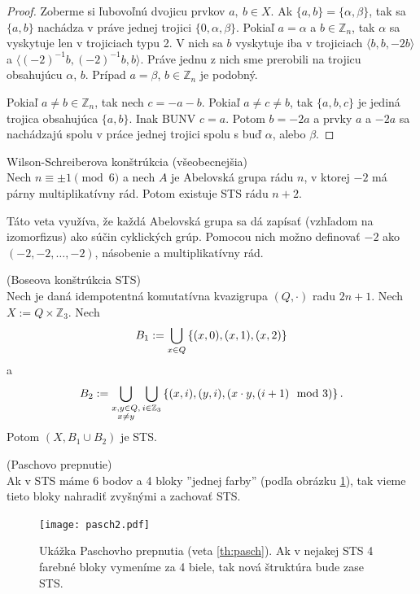 \begin{proof}
	Zoberme si ľubovoľnú dvojicu prvkov $a,\ b \in X$. Ak $\{ a, b \} = \{ \alpha, \beta \}$, tak sa $\{a, b\}$ nachádza v práve jednej trojici $\{0, \alpha, \beta \}$. Pokiaľ $a = \alpha$ a $b \in \mathbb{Z}_n$, tak $\alpha$ sa vyskytuje len v trojiciach typu 2. V nich sa $b$ vyskytuje iba v trojiciach $\langle b, b, -2b \rangle$ a $\langle (-2)^{-1}b, (-2)^{-1}b, b \rangle$. Práve jednu z nich sme prerobili na trojicu obsahujúcu $\alpha$, $b$. Prípad $a = \beta$, $b \in \mathbb{Z}_n$ je podobný.
	
	Pokiaľ $a \ne b \in \mathbb{Z}_n$, tak nech $c = - a - b$. Pokiaľ $a \ne c \ne b$, tak $\{a, b, c\}$ je jediná trojica obsahujúca $\{a, b\}$. Inak BUNV $c = a$. Potom $b = -2a$ a prvky $a$ a $-2a$ sa nachádzajú spolu v práce jednej trojici spolu s buď $\alpha$, alebo $\beta$.
\end{proof}

\begin{theorem_hard}{Wilson-Schreiberova konštrúkcia (všeobecnejšia)}\\
	Nech $n \equiv \pm 1 \pmod{6}$ a nech $A$ je Abelovská grupa rádu $n$, v ktorej $-2$ má párny multiplikatívny rád. Potom existuje STS rádu $n + 2$. 
\end{theorem_hard}

Táto veta využíva, že každá Abelovská grupa sa dá zapísať (vzhľadom na izomorfizus) ako súčin cyklických grúp. Pomocou nich možno definovať $-2$ ako $(-2,-2, \dots, -2)$, násobenie a multiplikatívny rád.

\begin{theorem_hard}{(Boseova konštrúkcia STS)}\\
\label{th:bose}
Nech je daná idempotentná komutatívna kvazigrupa $(Q, \cdot)$ radu $2n + 1$.
Nech $X := Q \times \mathbb{Z}_3$.
Nech $$B_1 := \bigcup_{x \in Q} \left\{(x, 0), (x, 1), (x, 2)\right\}$$ a $$B_2 := \bigcup_{\substack{x, y \in Q,\\ x \neq y}}\bigcup_{i \in \mathbb{Z}_3} \left\{(x, i), (y, i), (x \cdot y, (i+1) \mod 3)\right\}.$$
Potom $(X, B_1 \cup B_2)$ je STS.
\end{theorem_hard}

\begin{theorem_hard}{(Paschovo prepnutie)}\\
\label{th:pasch}
Ak v STS máme 6 bodov a 4 bloky ''jednej farby'' (podľa obrázku \ref{img:pasch}), tak vieme tieto bloky nahradiť zvyšnými a zachovať STS.
\end{theorem_hard}

\begin{figure}
    \centering
    \texttt{[image: pasch2.pdf]}
    \caption{Ukážka Paschovho prepnutia (veta \ref{th:pasch}). Ak v nejakej STS 4 farebné bloky vymeníme za 4 biele, tak nová štruktúra bude zase STS.}
    \label{img:pasch}
\end{figure}



